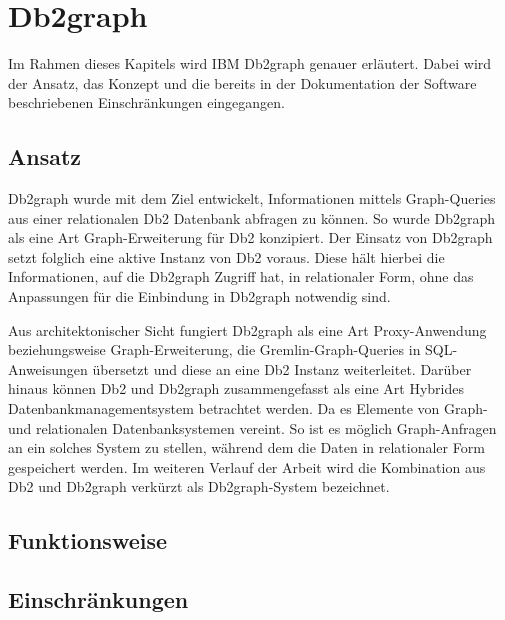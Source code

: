 \chapter{Db2graph}
\label{chap:db2graph}

Im Rahmen dieses Kapitels wird IBM Db2graph genauer erläutert. Dabei wird der Ansatz, das Konzept und die bereits in der Dokumentation der Software beschriebenen Einschränkungen eingegangen. 

\section{Ansatz}
\label{db2graph:ansatz}
Db2graph wurde mit dem Ziel entwickelt, Informationen mittels Graph-Queries aus einer relationalen Db2 Datenbank abfragen zu können. So wurde Db2graph als eine Art Graph-Erweiterung für Db2 konzipiert. Der Einsatz von Db2graph setzt folglich eine aktive Instanz von Db2 voraus. Diese hält hierbei die Informationen, auf die Db2graph Zugriff hat, in relationaler Form, ohne das Anpassungen für die Einbindung in Db2graph notwendig sind. 

Aus architektonischer Sicht fungiert Db2graph als eine Art Proxy-Anwendung beziehungsweise Graph-Erweiterung, die Gremlin-Graph-Queries in SQL-An\-wei\-sung\-en übersetzt und diese  an eine Db2 Instanz weiterleitet. Darüber hinaus können Db2 und Db2graph zusammengefasst als eine Art Hybrides Datenbankmanagementsystem betrachtet werden. Da es Elemente von Graph- und relationalen Datenbanksystemen vereint. So ist es möglich Graph-Anfragen an ein solches System zu stellen, während dem die Daten in relationaler Form gespeichert werden. Im weiteren Verlauf der Arbeit wird die Kombination aus Db2 und Db2graph verkürzt als Db2graph-System bezeichnet. 

\section{Funktionsweise}

\section{Einschränkungen}
